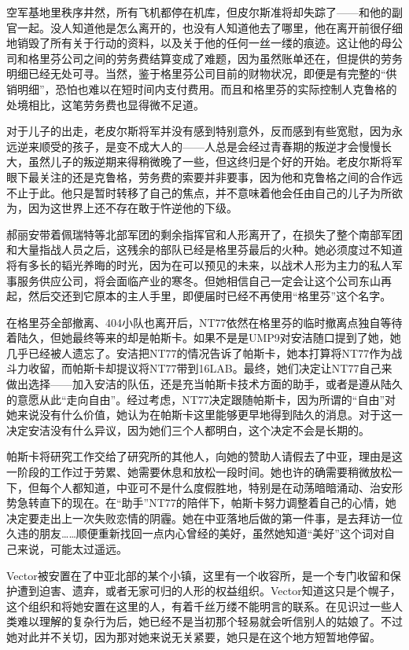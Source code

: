 空军基地里秩序井然，所有飞机都停在机库，但皮尔斯准将却失踪了——和他的副官一起。没人知道他是怎么离开的，也没有人知道他去了哪里，他在离开前很仔细地销毁了所有关于行动的资料，以及关于他的任何一丝一缕的痕迹。这让他的母公司和格里芬公司之间的劳务费结算变成了难题，因为虽然账单还在，但提供的劳务明细已经无处可寻。当然，鉴于格里芬公司目前的财物状况，即便是有完整的“供销明细”，恐怕也难以在短时间内支付费用。而且和格里芬的实际控制人克鲁格的处境相比，这笔劳务费也显得微不足道。

对于儿子的出走，老皮尔斯将军并没有感到特别意外，反而感到有些宽慰，因为永远逆来顺受的孩子，是变不成大人的——人总是会经过青春期的叛逆才会慢慢长大，虽然儿子的叛逆期来得稍微晚了一些，但这终归是个好的开始。老皮尔斯将军眼下最关注的还是克鲁格，劳务费的索要并非要事，因为他和克鲁格之间的合作远不止于此。他只是暂时转移了自己的焦点，并不意味着他会任由自己的儿子为所欲为，因为这世界上还不存在敢于忤逆他的下级。

郝丽安带着佩瑞特等北部军团的剩余指挥官和人形离开了，在损失了整个南部军团和大量指战人员之后，这残余的部队已经是格里芬最后的火种。她必须度过不知道将有多长的韬光养晦的时光，因为在可以预见的未来，以战术人形为主力的私人军事服务供应公司，将会面临产业的寒冬。但她相信自己一定会让这个公司东山再起，然后交还到它原本的主人手里，即便届时已经不再使用“格里芬”这个名字。

在格里芬全部撤离、404小队也离开后，NT77依然在格里芬的临时撤离点独自等待着陆久，但她最终等来的却是帕斯卡。如果不是是UMP9对安洁随口提到了她，她几乎已经被人遗忘了。安洁把NT77的情况告诉了帕斯卡，她本打算将NT77作为战斗力收留，而帕斯卡却提议将NT77带到16LAB。最终，她们决定让NT77自己来做出选择——加入安洁的队伍，还是充当帕斯卡技术方面的助手，或者是遵从陆久的意愿从此“走向自由”。经过考虑，NT77决定跟随帕斯卡，因为所谓的“自由”对她来说没有什么价值，她认为在帕斯卡这里能够更早地得到陆久的消息。对于这一决定安洁没有什么异议，因为她们三个人都明白，这个决定不会是长期的。

帕斯卡将研究工作交给了研究所的其他人，向她的赞助人请假去了中亚，理由是这一阶段的工作过于劳累、她需要休息和放松一段时间。她也许的确需要稍微放松一下，但每个人都知道，中亚可不是什么度假胜地，特别是在动荡暗暗涌动、治安形势急转直下的现在。在“助手”NT77的陪伴下，帕斯卡努力调整着自己的心情，她决定要走出上一次失败恋情的阴霾。她在中亚落地后做的第一件事，是去拜访一位久违的朋友……顺便重新找回一点内心曾经的美好，虽然她知道“美好”这个词对自己来说，可能太过遥远。

Vector被安置在了中亚北部的某个小镇，这里有一个收容所，是一个专门收留和保护遭到迫害、遗弃，或者无家可归的人形的权益组织。Vector知道这只是个幌子，这个组织和将她安置在这里的人，有着千丝万缕不能明言的联系。在见识过一些人类难以理解的复杂行为后，她已经不是当初那个轻易就会听信别人的姑娘了。不过她对此并不关切，因为那对她来说无关紧要，她只是在这个地方短暂地停留。

